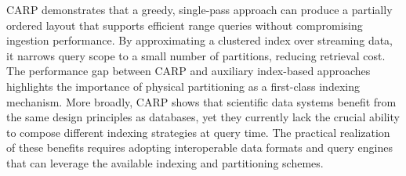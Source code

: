 CARP demonstrates that a greedy, single-pass approach can produce a partially ordered layout that
supports efficient range queries without compromising ingestion performance.
By approximating a clustered index over streaming data, it narrows query scope to a small number of
partitions, reducing retrieval cost.
The performance gap between CARP and auxiliary index-based approaches highlights the importance of
physical partitioning as a first-class indexing mechanism.
More broadly, CARP shows that scientific data systems benefit from the same design principles as
databases, yet they currently lack the crucial ability to compose different indexing strategies at
query time.
The practical realization of these benefits requires adopting interoperable data formats and query
engines that can leverage the available indexing and partitioning schemes.
